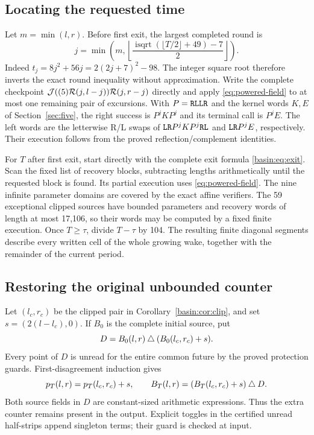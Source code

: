 \subsection{Locating the requested time}
Let $m=\min(l,r)$. Before first exit, the largest completed round is
\[
 j=\min\left(m,\left\lfloor
       \frac{\operatorname{isqrt}(\lfloor T/2\rfloor+49)-7}{2}
       \right\rfloor\right).
\]
Indeed $t_j=8j^2+56j=2(2j+7)^2-98$. The integer square root therefore inverts
the exact round inequality without approximation. Write the complete checkpoint
$\mathcal J((5)\mathcal R(j,l-j))\mathcal R(j,r-j)$ directly and apply
\eqref{eq:powered-field} to at most one remaining pair of excursions.
With $P=\texttt{RLLR}$ and the kernel words $K,E$ of
Section~\ref{sec:five}, the right success is $P^jKP^j$ and its terminal call
is $P^jE$. The left words are the letterwise R/L swaps of
$\texttt{LR}P^jKP^j\texttt{RL}$ and $\texttt{LR}P^jE$, respectively.
Their execution follows from the proved reflection/complement identities.

For $T$ after first exit, start directly with the complete exit formula
\eqref{basin:eq:exit}. Scan the fixed list of recovery blocks, subtracting
lengths arithmetically until the requested block is found. Its partial execution
uses \eqref{eq:powered-field}. The nine infinite parameter domains are covered
by the exact affine verifiers. The 59 exceptional clipped sources have bounded
parameters and recovery words of length at most 17,106, so their words may be
computed by a fixed finite execution. Once $T\ge\tau$, divide $T-\tau$ by 104.
The resulting finite diagonal segments describe every written cell of the
whole growing wake, together with the remainder of the current period.

\subsection{Restoring the original unbounded counter}
Let $(l_c,r_c)$ be the clipped pair in Corollary~\ref{basin:cor:clip}, and set
$s=(2(l-l_c),0)$. If $B_0$ is the complete initial source, put
\[
 D=B_0(l,r)\mathbin{\triangle}(B_0(l_c,r_c)+s).
\]
Every point of $D$ is unread for the entire common future by the proved
protection guards. First-disagreement induction gives
\[
 p_T(l,r)=p_T(l_c,r_c)+s,\qquad
 B_T(l,r)=(B_T(l_c,r_c)+s)\mathbin{\triangle} D.
\]
Both source fields in $D$ are constant-sized arithmetic expressions. Thus the
extra counter remains present in the output. Explicit toggles in the certified
unread half-strips append singleton terms; their guard is checked at input.


